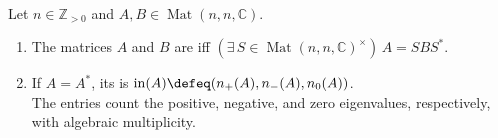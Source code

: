 \begin{definition} \label{def:star-congruence-and-hermitian-inertia} \\
Let $n\in\mathbb{Z}_{>0}$ and $A,B\in\operatorname{Mat}(n,n,\mathbb{C})$.
\begin{enumerate}[label=(\roman*)]
\setlength{\itemsep}{0pt}
\item The matrices $A$ and $B$ are  iff $(\exists\,S\in\operatorname{Mat}(n,n,\mathbb{C})^\times)\,A=SBS^*$.
\item If $A=A^*$, its  is $\operatorname{in}(A)\defeq(n_+(A),n_-(A),n_0(A))$.\\
The entries count the positive, negative, and zero eigenvalues, respectively, with algebraic multiplicity.
\end{enumerate}
\end{definition}

